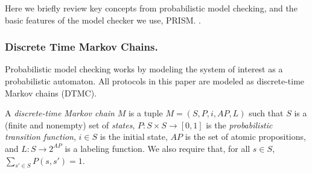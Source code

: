 
Here we briefly review key concepts from probabilistic model checking, and the basic
features of the model checker we use, PRISM\cite{PRISM}.
.

\subsubsection{Discrete Time Markov Chains.}

Probabilistic model checking works by modeling the system of interest as a 
probabilistic automaton. 
All protocols in this paper are modeled as discrete-time Markov chains (DTMC).

A \emph{discrete-time Markov chain} $M$ is a tuple $M=(S,P,i,AP,L)$ such that
$S$ is a (finite and nonempty) set of \emph{states},
$P: S \times S \rightarrow [0,1]$ is the \emph{probabilistic transition function},
$i \in S$ is the initial state,
$AP$ is the set of atomic propositions, and 
$L: S \rightarrow 2^{AP}$ is a labeling function.
We also require that, for all $s \in S$, $\sum_{s' \in S} P(s,s') = 1$. 

